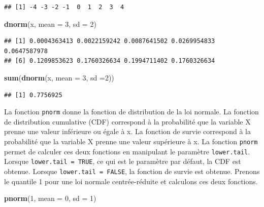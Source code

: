 \documentclass[
]{book}
\newenvironment{Shaded}{\begin{snugshade}}{\end{snugshade}}
\newcommand{\AttributeTok}[1]{\textcolor[rgb]{0.13,0.29,0.53}{#1}}
\newcommand{\DecValTok}[1]{\textcolor[rgb]{0.00,0.00,0.81}{#1}}
\newcommand{\FunctionTok}[1]{\textcolor[rgb]{0.13,0.29,0.53}{\textbf{#1}}}
\newcommand{\NormalTok}[1]{#1}
\begin{document}
\begin{verbatim}
## [1] -4 -3 -2 -1  0  1  2  3  4
\end{verbatim}

\begin{Shaded}
\begin{Highlighting}[]
\FunctionTok{dnorm}\NormalTok{(x, }\AttributeTok{mean =} \DecValTok{3}\NormalTok{, }\AttributeTok{sd =} \DecValTok{2}\NormalTok{)}
\end{Highlighting}
\end{Shaded}

\begin{verbatim}
## [1] 0.0004363413 0.0022159242 0.0087641502 0.0269954833 0.0647587978
## [6] 0.1209853623 0.1760326634 0.1994711402 0.1760326634
\end{verbatim}

\begin{Shaded}
\begin{Highlighting}[]
\FunctionTok{sum}\NormalTok{(}\FunctionTok{dnorm}\NormalTok{(x, }\AttributeTok{mean =} \DecValTok{3}\NormalTok{, }\AttributeTok{sd =}\DecValTok{2}\NormalTok{))}
\end{Highlighting}
\end{Shaded}

\begin{verbatim}
## [1] 0.7756925
\end{verbatim}

La fonction \texttt{pnorm} donne la fonction de distribution de la loi normale. La fonction de distribution cumulative (CDF) correspond à la probabilité que la variable X prenne une valeur inférieure ou égale à x. La fonction de survie correspond à la probabilité que la variable X prenne une valeur supérieure à x. La fonction \texttt{pnorm} permet de calculer ces deux fonctions en manipulant le paramètre \texttt{lower.tail}. Lorsque \texttt{lower.tail\ =\ TRUE}, ce qui est le paramètre par défaut, la CDF est obtenue. Lorsque \texttt{lower.tail\ =\ FALSE}, la fonction de survie est obtenue. Prenons le quantile 1 pour une loi normale centrée-réduite et calculons ces deux fonctions.

\begin{Shaded}
\begin{Highlighting}[]
\FunctionTok{pnorm}\NormalTok{(}\DecValTok{1}\NormalTok{, }\AttributeTok{mean =} \DecValTok{0}\NormalTok{, }\AttributeTok{sd =} \DecValTok{1}\NormalTok{)}
\end{Highlighting}
\end{Shaded}
\end{document}
